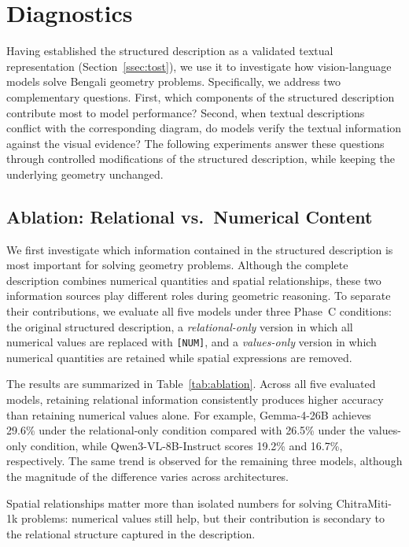 \documentclass[11pt]{article}
\begin{document}
\section{Diagnostics}
\label{sec:diagnostics}

Having established the structured description as a validated textual representation (Section~\ref{ssec:tost}), we use it to investigate how vision-language models solve Bengali geometry problems. Specifically, we address two complementary questions. First, which components of the structured description contribute most to model performance? Second, when textual descriptions conflict with the corresponding diagram, do models verify the textual information against the visual evidence? The following experiments answer these questions through controlled modifications of the structured description, while keeping the underlying geometry unchanged.

\subsection{Ablation: Relational vs.\ Numerical Content}
\label{ssec:ablation}

We first investigate which information contained in the structured description is most important for solving geometry problems. Although the complete description combines numerical quantities and spatial relationships, these two information sources play different roles during geometric reasoning. To separate their contributions, we evaluate all five models under three Phase~C conditions: the original structured description, a \emph{relational-only} version in which all numerical values are replaced with \texttt{[NUM]}, and a \emph{values-only} version in which numerical quantities are retained while spatial expressions are removed.

The results are summarized in Table~\ref{tab:ablation}. Across all five evaluated models, retaining relational information consistently produces higher accuracy than retaining numerical values alone. For example, Gemma-4-26B achieves 29.6\% under the relational-only condition compared with 26.5\% under the values-only condition, while Qwen3-VL-8B-Instruct scores 19.2\% and 16.7\%, respectively. The same trend is observed for the remaining three models, although the magnitude of the difference varies across architectures.

Spatial relationships matter more than isolated numbers for solving ChitraMiti-1k problems: numerical values still help, but their contribution is secondary to the relational structure captured in the description.
\end{document}
